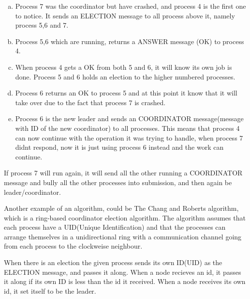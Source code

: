 \documentclass[Main]{subfiles}
\begin{document}
\begin{enumerate}[a)]
\item Process 7 was the coordinator but have crashed, and process 4 is the first one to notice. It sends an ELECTION message to all process above it, namely process 5,6 and 7.  
\item Process 5,6 which are running, returns a ANSWER message (OK) to process 4. 
\item When process 4 gets a OK from both 5 and 6, it will know its own job is done. Process 5 and 6 holds an election to the higher numbered processes. 
\item Process 6 returns an OK to process 5 and at this point it know that it will take over due to the fact that process 7 is crashed. 
\item Process 6 is the new leader and sends an COORDINATOR message(message with ID of the new coordinator) to all processes. This means that process 4 can now continue with the operation it was trying to handle, when process 7 didnt respond, now it is just using process 6 instead and the work can continue. 
\end{enumerate}

If process 7 will run again, it will send all the other running a COORDINATOR message and bully all the other processes into submission, and then again be leader/coordinator. \cite{ElectionAlgorithm} 

Another example of an algorithm, could be The Chang and Roberts algorithm, which is a ring-based coordinator election algorithm. The algorithm assumes that each process have a UID(Unique Identification) and that the processes can arrange themselves in a unidirectional ring with a communication channel going from each process to the clockweise neighbour.

When there is an election the given process sends its own ID(UID) as the ELECTION message, and passes it along. When a node recieves an id, it passes it along if its own ID is less than the id it received. When a node receives its own id, it set itself to be the leader. \cite{wiki-RingAlgorithm}
\end{document}
